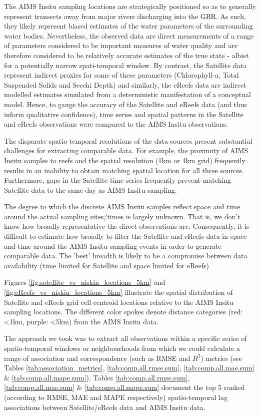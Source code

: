 The AIMS Insitu sampling locations are strategically positioned so as to generally represent
transects away from major rivers discharging into the GBR.  As such, they likely represent biased
estimates of the water parameters of the surrounding water bodies.  Nevertheless, the observed data
are direct measurements of a range of parameters considered to be important measures of water
quality and are therefore considered to be relatively accurate estimates of the true state - albiet
for a potentially narrow spati-temporal window.  By contrast, the Satellite data represent indirect
proxies for some of these parameters (Chlorophyll-a, Total Suspended Solids and Secchi Depth) and
similarly, the eReefs data are indirect modelled estimates simulated from a deterministic
manifestation of a conceptual model.  Hence, to gauge the accuracy of the Satellite and eReefs data
(and thus inform qualitative confidence), time series and spatial patterns in the Satellite and
eReefs observations were compared to the AIMS Insitu observations.
 
The disparate spatio-temporal resolutions of the data sources present substantial challenges for
extracting comparable data.  For example, the proximity of AIMS Insitu samples to reefs and the
spatial resolution (1km or 4km grid) frequently results in an inability to obtain matching spatial
location for all three sources.  Furthermore, gaps in the Satellite time series frequently prevent
matching Satellite data to the same day as AIMS Insitu sampling.

The degree to which the discrete AIMS Insitu samples reflect space and time around the actual
sampling sites/times is largely unknown.  That is, we don't know how broadly representative the
direct observations are.  Consequently, it is difficult to estimate how broadly to filter the
Satellite and eReefs data in space and time around the AIMS Insitu sampling events in order to
generate comparable data.  The 'best' breadth is likely to be a compromise between data availability
(time limited for Satellite and space limited for eReefs)

Figures \ref{fig:satellite_vs_niskin_locations_5km} and \ref{fig:eReefs_vs_niskin_locations_5km}
illustrate the spatial distribution of Satellite and eReefs grid cell centroid locations relative to
the AIMS Insitu sampling locations.  The different color spokes denote distance categories (red:
<1km, purple: <5km) from the AIMS Insitu data.

The approach we took was to extract all observations within a specific series of spatio-temporal
windows or neighbourhoods from which we could calculate a range of association and correspondence
(such as RMSE and $R^2$) metrics (see Tables \ref{tab:association_metrics},
\ref{tab:comp.all.rmse.sum}, \ref{tab:comp.all.mae.sum} \& \ref{tab:comp.all.mape.sum}).  Tables
\ref{tab:comp.all.rmse.sum}, \ref{tab:comp.all.mae.sum} \& \ref{tab:comp.all.mape.sum} document the
top 5 ranked (according to RMSE, MAE and MAPE respectively) spatio-temporal lag associations between
Satellite/eReefs data and AIMS Insitu data.
   

